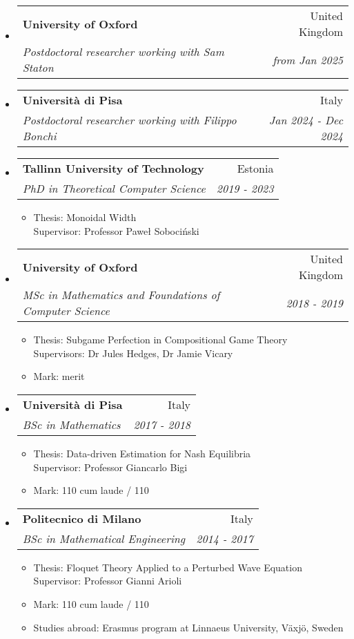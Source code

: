 \documentclass[letterpaper,11pt]{article}
\makeatletter
\newcommand{\resitem}[1]{\item #1 \vspace{-2pt}}
\newcommand{\ressubheading}[4]{
\begin{tabular*}{6.5in}{l@{\cftdotfill{\cftsecdotsep}\extracolsep{\fill}}r}
		\textbf{#1} & #2 \\
		\textit{#3} & \textit{#4} \\
\end{tabular*}\vspace{-6pt}}
\makeatother
\begin{document}
\begin{itemize}
\item[] \ressubheading{University of Oxford}{United Kingdom}{Postdoctoral researcher working with Sam Staton}{from Jan 2025}

\item[] \ressubheading{Università di Pisa}{Italy}{Postdoctoral researcher working with Filippo Bonchi}{Jan 2024 - Dec 2024}

\item[] \ressubheading{Tallinn University of Technology}{Estonia}{PhD in Theoretical Computer Science}{2019 - 2023}

\begin{itemize}
	\resitem{Thesis: Monoidal Width \\
	Supervisor: Professor Pawe{\l} Soboci{\'n}ski}

\end{itemize}

\item[] \ressubheading{University of Oxford}{United Kingdom}{MSc in Mathematics and Foundations of Computer Science}{2018 - 2019}

\begin{itemize}
	\resitem{Thesis: Subgame Perfection in Compositional Game Theory \\
	Supervisors: Dr Jules Hedges, Dr Jamie Vicary}
	\resitem{Mark: merit}
\end{itemize}

\item[] \ressubheading{Universit\`a di Pisa}{Italy}{BSc in Mathematics}{2017 - 2018}

\begin{itemize}
	\resitem{Thesis: Data-driven Estimation for Nash Equilibria \\
	Supervisor: Professor Giancarlo Bigi}
	\resitem{Mark: 110 cum laude / 110}
\end{itemize}

\item[] \ressubheading{Politecnico di Milano}{Italy}{BSc in Mathematical Engineering}{2014 - 2017}

\begin{itemize}
	\resitem{Thesis: Floquet Theory Applied to a Perturbed Wave Equation \\
	Supervisor: Professor Gianni Arioli}
	\resitem{Mark: 110 cum laude / 110}
	\resitem{Studies abroad: Erasmus program at Linnaeus University, V\"axj\"o, Sweden}
\end{itemize}
\end{itemize}
\newpage
\end{document}
